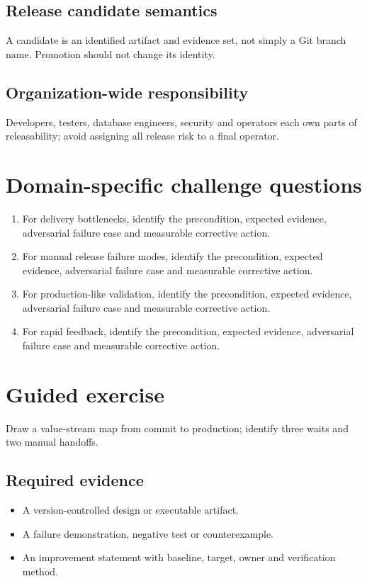 \documentclass[10pt,letterpaper]{article}
\begin{document}
\subsection{Release candidate semantics}
A candidate is an identified artifact and evidence set, not simply a Git branch name. Promotion should not change its identity.

\subsection{Organization-wide responsibility}
Developers, testers, database engineers, security and operators each own parts of releasability; avoid assigning all release risk to a final operator.

\section{Domain-specific challenge questions}
\begin{enumerate}
\item For delivery bottlenecks, identify the precondition, expected evidence, adversarial failure case and measurable corrective action.
\item For manual release failure modes, identify the precondition, expected evidence, adversarial failure case and measurable corrective action.
\item For production-like validation, identify the precondition, expected evidence, adversarial failure case and measurable corrective action.
\item For rapid feedback, identify the precondition, expected evidence, adversarial failure case and measurable corrective action.
\end{enumerate}
\section{Guided exercise}
Draw a value-stream map from commit to production; identify three waits and two manual handoffs.

\subsection{Required evidence}
\begin{itemize}
\item A version-controlled design or executable artifact.
\item A failure demonstration, negative test or counterexample.
\item An improvement statement with baseline, target, owner and verification method.
\end{itemize}
\end{document}
